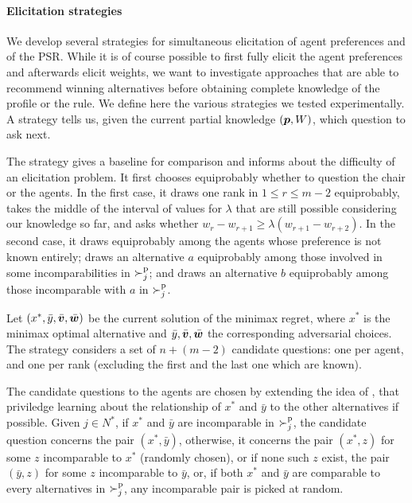 \documentclass{article}
\begin{document}
\paragraph{Elicitation strategies}
We develop several strategies for simultaneous elicitation of agent preferences and of the PSR.
While it is of course possible to first fully elicit the agent preferences and afterwards elicit weights, we want to investigate approaches that are able to recommend winning alternatives before obtaining complete knowledge of the profile or the rule.
We define here the various strategies we tested experimentally. A strategy tells us, given the current partial knowledge $({\bm{p}}, W)$, which question to ask next.

The  strategy gives a baseline for comparison and informs about the difficulty of an elicitation problem. 
It first chooses equiprobably whether to question the chair or the agents. In the first case, it draws one rank in $1 ≤ r ≤ m-2$ equiprobably, takes the middle of the interval of values for $\lambda$ that are still possible considering our knowledge so far, and asks whether $w_r - w_{r+1} ≥ \lambda (w_{r+1} - w_{r+2})$.
In the second case, it draws equiprobably among the agents whose preference is not known entirely; draws an alternative $a$ equiprobably among those involved in some incomparabilities in $\succ^\text{p}_j$; and draws an alternative $b$ equiprobably among those incomparable with $a$ in $\succ^\text{p}_j$.

Let $(x^{*},\bar{y}, \bar{\bm{v}}, \bar{\bm{w}})$ be the current solution of the minimax regret, where $x^{*}$ is the minimax optimal alternative and $\bar{y}, \bar{\bm{v}}, \bar{\bm{w}}$ the corresponding adversarial choices. 
The  strategy considers a set of $n + (m-2)$ candidate questions: one per agent, and one per rank (excluding the first and the last one which are known).

The candidate questions to the agents are chosen by extending the idea of \citet{Lu2011}, that priviledge learning about the relationship of $x^*$ and $\bar{y}$ to the other alternatives if possible.
	Given $j \in N^*$, if $x^*$ and $\bar{y}$ are incomparable in $\succ^\text{p}_j$, the candidate question concerns the pair $(x^*, \bar{y})$, otherwise, %
	it concerns the pair $(x^*, z)$ for some $z$ incomparable to $x^*$ (randomly chosen), or if none such $z$ exist, the pair $(\bar{y}, z)$ for some $z$ incomparable to $\bar{y}$, or, if both $x^*$ and $\bar{y}$ are comparable to every alternatives in $\succ^\text{p}_j$, any incomparable pair is picked at random. 
\end{document}
